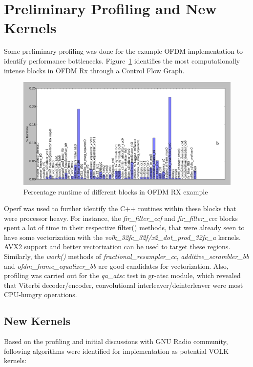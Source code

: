\documentclass[a4paper,12pt,oneside]{article}
\begin{document}
\section{Preliminary Profiling and New Kernels}
\label{sec:profiling}
Some preliminary profiling was done for the example OFDM implementation to identify performance bottlenecks. Figure~\ref{fig:1} identifies the most computationally intense blocks in OFDM Rx through a Control Flow Graph. 

\begin{figure}[h] 
\centering\includegraphics[width=5in]{figure/ofdm_rx.png}
\caption{Percentage runtime of different blocks in OFDM RX example \label{fig:1} }
\end{figure}

Operf \cite{oprofile} was used to further identify the C++ routines within these blocks that were processor heavy. For instance, the {\it fir\_filter\_ccf} and {\it fir\_filter\_ccc} blocks spent a lot of time in their respective filter() methods, that were already seen to have some vectorization with the {\it volk\_32fc\_32f/x2\_dot\_prod\_32fc\_a} kernels. AVX2 support and better vectorization can be used to target these regions. Similarly, the {\it work()} methods of {\it fractional\_resampler\_cc}, {\it additive\_scrambler\_bb} and {\it ofdm\_frame\_equalizer\_bb} are good candidates for vectorization. Also, profiling was carried out for the {\it qa\_atsc} test in gr-atsc module, which revealed that Viterbi decoder/encoder, convolutional interleaver/deinterleaver were most CPU-hungry operations.

\subsection{New Kernels}

Based on the profiling and initial discussions with GNU Radio community, following algorithms were identified for implementation as potential VOLK kernels:
\end{document}
